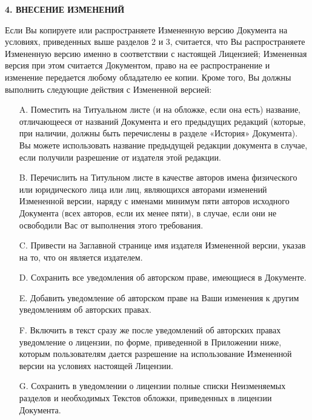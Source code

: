 \begin{center}
{\Large\bf 4. ВНЕСЕНИЕ ИЗМЕНЕНИЙ\par}
\end{center}

Если Вы копируете или распространяете Измененную версию Документа на
условиях, приведенных выше разделов 2 и 3, считается, что Вы
распространяете Измененную версию именно в соответствии с настоящей
Лицензией; Измененная версия при этом считается Документом, право на
ее распространение и изменение передается любому обладателю ее
копии. Кроме того, Вы должны выполнить следующие действия с Измененной
версией:

\begin{itemize}
\item[A.]
Поместить на Титуальном листе (и на обложке, если она есть) название,
отличающееся от названий Документа и его предыдущих редакций (которые,
при наличии, должны быть перечислены в разделе «История»
Документа). Вы можете использовать название предыдущей редакции
документа в случае, если получили разрешение от издателя этой
редакции.

\item[B.]
Перечислить на Титульном листе в качестве авторов имена физического
или юридического лица или лиц, являющихся авторами изменений
Измененной версии, наряду с именами минимум пяти авторов исходного
Документа (всех авторов, если их менее пяти), в случае, если они не
освободили Вас от выполнения этого требования.

\item[C.]
Привести на Заглавной странице имя издателя Измененной версии, указав
на то, что он является издателем.

\item[D.]
Сохранить все уведомления об авторском праве, имеющиеся в Документе.

\item[E.]
Добавить уведомление об авторском праве на Ваши изменения к другим
уведомлениям об авторских правах.

\item[F.]
Включить в текст сразу же после уведомлений об авторских правах
уведомление о лицензии, по форме, приведенной в Приложении ниже,
которым пользователям дается разрешение на использование Измененной
версии на условиях настоящей Лицензии.

\item[G.]
Сохранить в уведомлении о лицензии полные списки Неизменяемых разделов
и необходимых Текстов обложки, приведенных в лицензии Документа.


\end{itemize}
